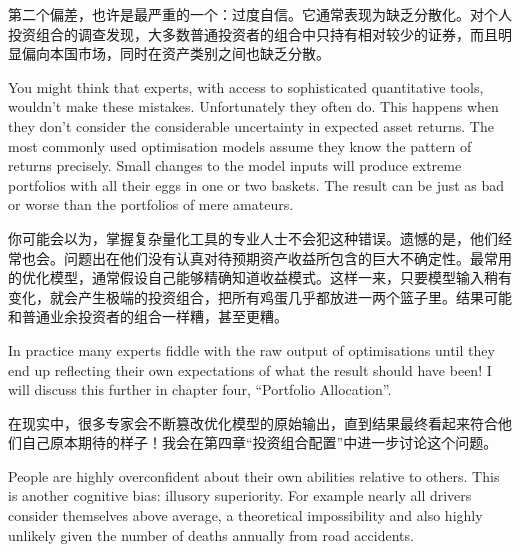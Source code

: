 \begin{chineseblock}第二个偏差，也许是最严重的一个：过度自信。它通常表现为缺乏分散化。对个人投资组合的调查发现，大多数普通投资者的组合中只持有相对较少的证券，而且明显偏向本国市场，同时在资产类别之间也缺乏分散。\end{chineseblock}

\bipairgap

\begin{englishblock} You might think that experts, with access to sophisticated quantitative tools, wouldn't make these mistakes. Unfortunately they often do. This happens when they don't consider the considerable uncertainty in expected asset returns. The most commonly used optimisation models assume they know the pattern of returns precisely. Small changes to the model inputs will produce extreme portfolios with all their eggs in one or two baskets. The result can be just as bad or worse than the portfolios of mere amateurs. \end{englishblock}

\begin{chineseblock}你可能会以为，掌握复杂量化工具的专业人士不会犯这种错误。遗憾的是，他们经常也会。问题出在他们没有认真对待预期资产收益所包含的巨大不确定性。最常用的优化模型，通常假设自己能够精确知道收益模式。这样一来，只要模型输入稍有变化，就会产生极端的投资组合，把所有鸡蛋几乎都放进一两个篮子里。结果可能和普通业余投资者的组合一样糟，甚至更糟。\end{chineseblock}

\bipairgap

\begin{englishblock} In practice many experts fiddle with the raw output of optimisations until they end up reflecting their own expectations of what the result should have been! I will discuss this further in chapter four, ``Portfolio Allocation''. \end{englishblock}

\begin{chineseblock}在现实中，很多专家会不断篡改优化模型的原始输出，直到结果最终看起来符合他们自己原本期待的样子！我会在第四章“投资组合配置”中进一步讨论这个问题。\end{chineseblock}


\begin{englishblock} People are highly overconfident about their own abilities relative to others. This is another cognitive bias: illusory superiority. For example nearly all drivers consider themselves above average, a theoretical impossibility and also highly unlikely given the number of deaths annually from road accidents. \end{englishblock}

